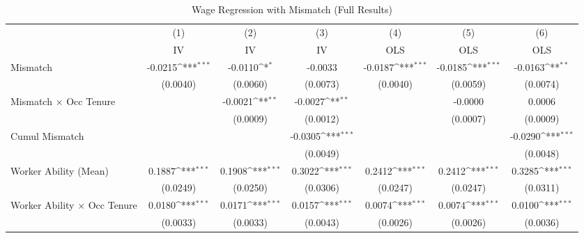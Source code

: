 {
\def\sym#1{\ifmmode^{#1}\else\(^{#1}\)\fi}
\begin{longtable}{l*{6}{c}}
\caption{Wage Regression with Mismatch (Full Results)}\\
\hline  \endfirsthead\hline  \endhead\hline  \endfoot\endlastfoot
                    &\multicolumn{1}{c}{(1)}&\multicolumn{1}{c}{(2)}&\multicolumn{1}{c}{(3)}&\multicolumn{1}{c}{(4)}&\multicolumn{1}{c}{(5)}&\multicolumn{1}{c}{(6)}\\
                    &\multicolumn{1}{c}{IV}&\multicolumn{1}{c}{IV}&\multicolumn{1}{c}{IV}&\multicolumn{1}{c}{OLS}&\multicolumn{1}{c}{OLS}&\multicolumn{1}{c}{OLS}\\
\hline  
Mismatch            &     -0.0215\sym{***}&     -0.0110\sym{*}  &     -0.0033         &     -0.0187\sym{***}&     -0.0185\sym{***}&     -0.0163\sym{**} \\
                    &    (0.0040)         &    (0.0060)         &    (0.0073)         &    (0.0040)         &    (0.0059)         &    (0.0074)         \\
Mismatch $\times$ Occ Tenure&                     &     -0.0021\sym{**} &     -0.0027\sym{**} &                     &     -0.0000         &      0.0006         \\
                    &                     &    (0.0009)         &    (0.0012)         &                     &    (0.0007)         &    (0.0009)         \\
Cumul Mismatch      &                     &                     &     -0.0305\sym{***}&                     &                     &     -0.0290\sym{***}\\
                    &                     &                     &    (0.0049)         &                     &                     &    (0.0048)         \\
Worker Ability (Mean)&      0.1887\sym{***}&      0.1908\sym{***}&      0.3022\sym{***}&      0.2412\sym{***}&      0.2412\sym{***}&      0.3285\sym{***}\\
                    &    (0.0249)         &    (0.0250)         &    (0.0306)         &    (0.0247)         &    (0.0247)         &    (0.0311)         \\
Worker Ability $\times$ Occ Tenure&      0.0180\sym{***}&      0.0171\sym{***}&      0.0157\sym{***}&      0.0074\sym{***}&      0.0074\sym{***}&      0.0100\sym{***}\\
                    &    (0.0033)         &    (0.0033)         &    (0.0043)         &    (0.0026)         &    (0.0026)         &    (0.0036)         \\

\end{longtable}}
